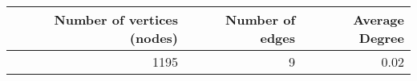 \begin{tabular}{rrr}
\toprule
 Number of vertices (nodes) &  Number of edges &  Average Degree \\
\midrule
                       1195 &                9 &            0.02 \\
\bottomrule
\end{tabular}
